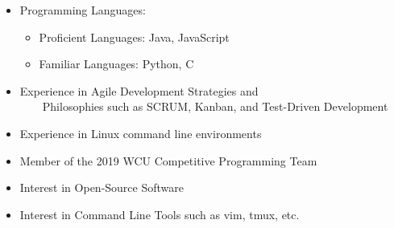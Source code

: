 \documentclass[10pt]{letter}
\begin{document}
    \begin{itemize}
        \itemsep 0em
        \item Programming Languages:
            \vspace{-1mm}
            \begin{itemize}
                \itemsep 0em
                \item Proficient Languages: Java, JavaScript
                \item Familiar Languages: Python, C
            \end{itemize}
            \vspace{-1mm}
        \item{Experience in Agile Development Strategies and \\
            ~~~~Philosophies such as SCRUM, Kanban, and Test-Driven Development}
        \item{Experience in Linux command line environments}
        \item{Member of the 2019 WCU Competitive Programming Team}
        \item{Interest in Open-Source Software}
        \item{Interest in Command Line Tools such as vim, tmux, etc.}
    \end{itemize}
\end{document}
